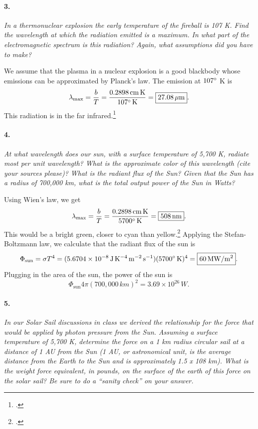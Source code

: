 \documentclass[12pt]{article}
\begin{document}
\paragraph{3.} \emph{In a thermonuclear explosion the early temperature of the fireball is 107 K. Find the wavelength at which the radiation emitted is a maximum. In what part of the electromagnetic spectrum is this radiation? Again, what assumptions did you have to make?} \medskip

We assume that the plasma in a nuclear explosion is a good blackbody whose emissions can be approximated by Planck's law. The emission at $107\degree$ K is
\begin{equation}
    \lambda_\text{max} = \frac{b}{T} = \frac{0.2898\,\si{cm.K}}{107\degree\,\si{K}} = \boxed{27.08\,\si{\mu m}}.
\end{equation}
This radiation is in the far infrared.\footcite{em}

\paragraph{4.} \emph{At what wavelength does our sun, with a surface temperature of 5,700 K, radiate most per unit wavelength? What is the approximate color of this wavelength (cite your sources please)? What is the radiant flux of the Sun? Given that the Sun has a radius of 700,000 km, what is the total output power of the Sun in Watts?} \medskip

Using Wien's law, we get
\begin{equation}
    \lambda_\text{max} = \frac{b}{T} = \frac{0.2898\,\si{cm.K}}{5700\degree\,\si{K}} = \boxed{508\,\si{nm}}.
\end{equation}
This would be a bright green, closer to cyan than yellow.\footcite{em} Applying the Stefan-Boltzmann law, we calculate that the radiant flux of the sun is
\begin{equation}
    \Phi_\text{sun} = \sigma T^4 = (5.6704\times10^{-8}\,\si{J.K^{-4}.m^{-2}.s^{-1}}) (5700\degree\,\si{K})^4 = \boxed{60\,\si{MW/m^2}}.
\end{equation}
Plugging in the area of the sun, the power of the sun is
\begin{equation}
    \Phi_\text{sun} 4\pi (700,000\,\si{km})^2 = \boxed{3.69\times10^{26}\,\si{W}}.
\end{equation}

\paragraph{5.} \emph{In our Solar Sail discussions in class we derived the relationship for the force that would be applied by photon pressure from the Sun. Assuming a surface temperature of 5,700 K, determine the force on a 1 km radius circular sail at a distance of 1 AU from the Sun (1 AU, or astronomical unit, is the average distance from the Earth to the Sun and is approximately 1.5 x 108 km). What is the weight force equivalent, in pounds, on the surface of the earth of this force on the solar sail? Be sure to do a “sanity check” on your answer.} \medskip
\end{document}
